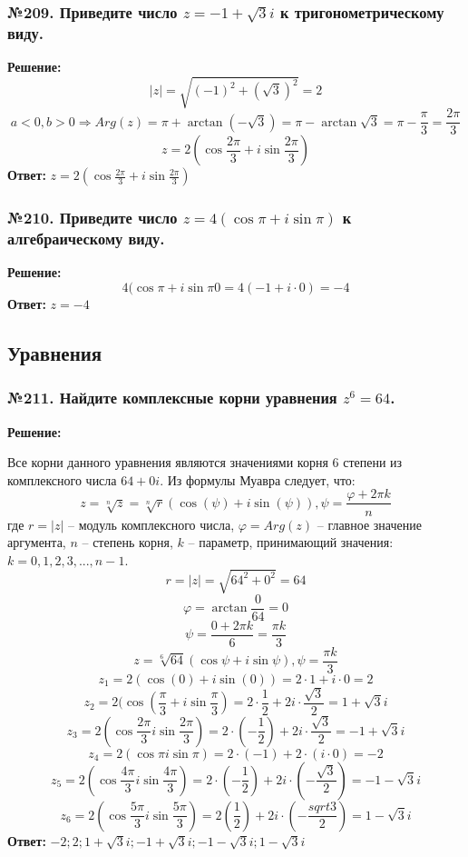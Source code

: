 \documentclass[a4paper]{article}
\begin{document}
\subsubsection*{№209. Приведите число $z=-1+\sqrt{3}i$ к тригонометрическому виду.}
\textbf{Решение:}
\[|z|=\sqrt{(-1)^2+(\sqrt{3})^2}=2\]
\[a<0, b>0 \Rightarrow Arg(z) = \pi + \arctan(-\sqrt{3})=\pi-\arctan\sqrt{3}=\pi-\frac{\pi}{3}=\frac{2\pi}{3}\]
\[z=2(\cos{\frac{2\pi}{3}}+i\sin{\frac{2\pi}{3}})\]
\textbf{Ответ:} $z=2(\cos{\frac{2\pi}{3}}+i\sin{\frac{2\pi}{3}})$

\subsubsection*{№210. Приведите число $z=4(\cos{\pi}+i\sin{\pi})$ к алгебраическому виду.}
\textbf{Решение:}
\[4(\cos{\pi}+i\sin{\pi}0=4(-1+i\cdot0)=-4\] 
\textbf{Ответ:} $z=-4$

\subsection*{Уравнения}
\subsubsection*{№211. Найдите комплексные корни уравнения $z^6=64$.}
\textbf{Решение:} \par 
Все корни данного уравнения являются значениями корня $6$ степени из комплексного числа $64+0i$.
Из формулы Муавра следует, что:
\[z=\sqrt[n]{z}=\sqrt[n]{r}(\cos{(\psi)}+i\sin{(\psi)}), \psi=\frac{\varphi+2\pi k}{n}\]
где $r=|z|$ -- модуль комплексного числа, $\varphi=Arg(z)$ -- главное значение аргумента, $n$ -- степень корня, $k$ -- параметр, принимающий значения: $k={0,1,2,3,...,n-1}$.
\[r=|z|=\sqrt{64^2+0^2}=64\]
\[\varphi=\arctan{\frac{0}{64}}=0\]
\[\psi=\frac{0+2\pi k}{6}=\frac{\pi k}{3}\]
\[z=\sqrt[6]{64}(\cos{\psi}+i\sin{\psi}), \psi=\frac{\pi k}{3}\]
\[z_1=2(\cos(0)+i\sin(0))=2\cdot1+i\cdot0=2\]
\[z_2=2(\cos(\frac{\pi}{3}+i\sin{\frac{\pi}{3}})=2\cdot\frac{1}{2}+2i\cdot\frac{\sqrt{3}}{2}=1+\sqrt{3}i\]
\[z_3=2(\cos{\frac{2\pi}{3}}i\sin{\frac{2\pi}{3}})=2\cdot(-\frac{1}{2})+2i\cdot\frac{\sqrt{3}}{2}=-1+\sqrt{3}i\]
\[z_4=2(\cos{\pi}i\sin{\pi})=2\cdot(-1)+2\cdot(i\cdot0)=-2\]
\[z_5=2(\cos{\frac{4\pi}{3}}i\sin{\frac{4\pi}{3}})=2\cdot(-\frac{1}{2})+2i\cdot(-\frac{\sqrt{3}}{2})=-1-\sqrt{3}i\]
\[z_6=2(\cos{\frac{5\pi}{3}}i\sin{\frac{5\pi}{3}})=2(\frac{1}{2})+2i\cdot(-\frac{sqrt{3}}{2})=1-\sqrt{3}i\]
\textbf{Ответ:} $\displaystyle -2;2;1+\sqrt{3}i;-1+\sqrt{3}i;-1-\sqrt{3}i;1-\sqrt{3}i$
\end{document}
